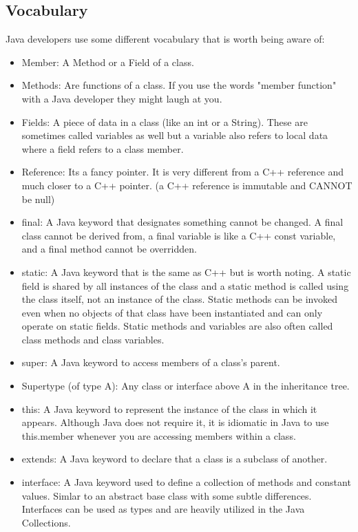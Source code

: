 \documentclass[../../main.tex]{subfiles}
\begin{document}
\subsection{Vocabulary}
Java developers use some different vocabulary that is worth being
aware of:
   \begin{itemize}
      \item Member: A Method or a Field of a class.
      \item Methods: Are functions of a class. If you use the words
         "member function" with a Java developer they might laugh at you.
      \item Fields: A piece of data in a class (like an int or a
         String). These are sometimes called variables as well but a
         variable also refers to local data where a field refers to a
         class member.
      \item Reference: Its a fancy pointer. It is very different
         from a C++ reference and much closer to a C++ pointer.
         (a C++ reference is immutable and CANNOT be null)
      \item final: A Java keyword that designates something cannot be
         changed. A final class cannot be derived from, a final
         variable is like a C++ const variable, and a final method
         cannot be overridden.
      \item static: A Java keyword that is the same as C++ but is worth
         noting. A static field is shared by all instances of the class
         and a static method is called using the class itself, not an
         instance of the class. Static methods can be invoked even when
         no objects of that class have been instantiated and can only
         operate on static fields. Static methods and variables are
         also often called class methods and class variables.
      \item super: A Java keyword to access members of a class's
         parent.
      \item Supertype (of type A): Any class or interface above A in
         the inheritance tree.
      \item this: A Java keyword to represent the instance of the class
         in which it appears. Although Java does not require it, it is
         idiomatic in Java to use this.member whenever you are
         accessing members within a class.
      \item extends: A Java keyword to declare that a class is a
         subclass of another.
      \item interface: A Java keyword used to define a collection of
         methods and constant values. Simlar to an abstract base class
         with some subtle differences. Interfaces can be used as types
         and are heavily utilized in the Java Collections.
   \end{itemize}
\end{document}
